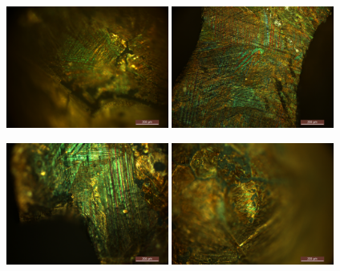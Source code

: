 \documentclass[usenames,dvipsnames]{beamer}
\begin{document}
\begin{frame}

\includegraphics[width=0.4\textwidth]{img/intro/EspAMicro4.jpg}
\includegraphics[width=0.4\textwidth]{img/intro/EspAMicro1.jpg}

\includegraphics[width=0.4\textwidth]{img/intro/EspAMicro2.jpg}
\includegraphics[width=0.4\textwidth]{img/intro/EspAMicro3.jpg}
 
\end{frame}



\end{document}
